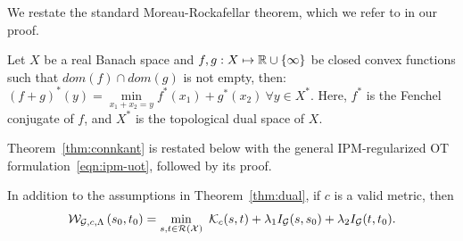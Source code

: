 We restate the standard Moreau-Rockafellar theorem, which we refer to in our proof.
\begin{theorem}\label{thm:mr}
Let $X$ be a real Banach space and $f,g:X\mapsto\mathbb{R}\cup\{\infty\}$ be closed convex functions such that $dom(f)\cap dom(g)$ is not empty, then:
$(f+g)^*(y)=\min\limits_{x_1+x_2=y}f^*(x_1)+g^*(x_2)\ \forall y\in X^*$. Here, $f^*$ is the Fenchel conjugate of $f$, and $X^*$ is the topological dual space of $X$.
\end{theorem}

Theorem~\ref{thm:connkant} is restated below with the general IPM-regularized OT formulation~\ref{eqn:ipm-uot}, followed by its proof.
\begin{theoremBox}
\begin{theorem}
In addition to the assumptions in Theorem~\ref{thm:dual}, if $c$ is a valid metric, then
\begin{equation}\label{eqn:ipmkant}
    \mathcal{W}_{\mathcal{G}, c, \Lambda}\left(s_0,t_0\right) =\min\limits_{s,t\in\mathcal{R}(\mathcal{X})}\  \mathcal{K}_c(s,t) + \lambda_1  I_{\mathcal{G}}(s,s_0) + \lambda_2  I_{\mathcal{G}}(t,t_0).
\end{equation}
\end{theorem}\label{gen-kantdual}
\end{theoremBox}
